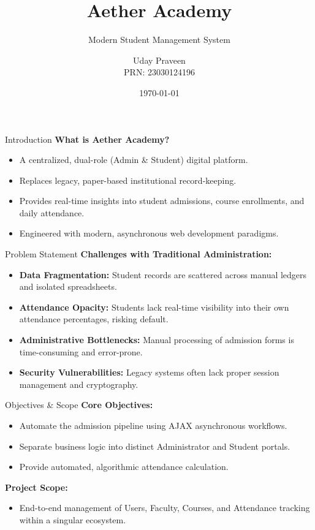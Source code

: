 \documentclass[11pt, aspectratio=169]{beamer}
\title[Aether Academy LMS]{\textbf{Aether Academy}}
\subtitle{Modern Student Management System}
\author[Uday Praveen]{Uday Praveen \\ PRN: 23030124196}
\institute[SICSR]{Symbiosis Institute of Computer Studies and Research (SICSR), Pune}
\date{\today}
\begin{document}
\begin{frame}
    \titlepage
\end{frame}

\begin{frame}{Introduction}
    \textbf{What is Aether Academy?}
    \vspace{0.3cm}
    \begin{itemize}
        \item A centralized, dual-role (Admin \& Student) digital platform.
        \item Replaces legacy, paper-based institutional record-keeping.
        \item Provides real-time insights into student admissions, course enrollments, and daily attendance.
        \item Engineered with modern, asynchronous web development paradigms.
    \end{itemize}
\end{frame}

\begin{frame}{Problem Statement}
    \textbf{Challenges with Traditional Administration:}
    \vspace{0.3cm}
    \begin{itemize}
        \item \textbf{Data Fragmentation:} Student records are scattered across manual ledgers and isolated spreadsheets.
        \item \textbf{Attendance Opacity:} Students lack real-time visibility into their own attendance percentages, risking default.
        \item \textbf{Administrative Bottlenecks:} Manual processing of admission forms is time-consuming and error-prone.
        \item \textbf{Security Vulnerabilities:} Legacy systems often lack proper session management and cryptography.
    \end{itemize}
\end{frame}

\begin{frame}{Objectives \& Scope}
    \textbf{Core Objectives:}
    \begin{itemize}
        \item Automate the admission pipeline using AJAX asynchronous workflows.
        \item Separate business logic into distinct Administrator and Student portals.
        \item Provide automated, algorithmic attendance calculation.
    \end{itemize}
    \vspace{0.3cm}
    \textbf{Project Scope:}
    \begin{itemize}
        \item End-to-end management of Users, Faculty, Courses, and Attendance tracking within a singular ecosystem.
    \end{itemize}
\end{frame}
\end{document}
